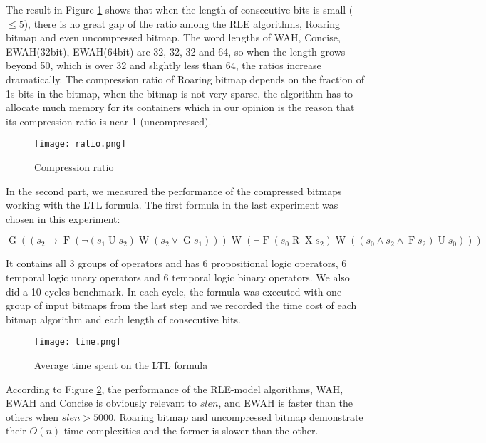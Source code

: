 The result in Figure \ref{img:ratio} shows that when the length of consecutive bits is small ($\leq 5$), there is no great gap of the ratio among the RLE algorithms, Roaring bitmap and even uncompressed bitmap. The word lengths of WAH, Concise, EWAH(32bit), EWAH(64bit) are 32, 32, 32 and 64, so when the length grows beyond 50, which is over 32 and slightly less than 64, the ratios increase dramatically. The compression ratio of Roaring bitmap depends on the fraction of 1s bits in the bitmap, when the bitmap is not very sparse, the algorithm has to allocate much memory for its containers which in our opinion is the reason that its compression ratio is near 1 (uncompressed).

\begin{figure}[h]
\begin{center}
\centering
\texttt{[image: ratio.png]}
\caption{Compression ratio}
\label{img:ratio}
\end{center}
\end{figure}

In the second part, we measured the performance of the compressed bitmaps working with the LTL formula. The first formula in the last experiment was chosen in this experiment: 

\begin{small}
$\mathop{G}((s_2 \mathrel{\rightarrow} \mathop{F}(\mathop{\neg}(s_1 \mathrel{U} s_2) \mathrel{W} (s_2 \mathrel{\vee} \mathop{G}s_1))) \mathrel{W} (\mathop{\neg}\mathop{F}(s_0 \mathrel{R} \mathop{X}s_2) \mathrel{W} ((s_0 \mathrel{\wedge} s_2 \mathrel{\wedge} \mathop{F}s_2) \mathrel{U} s_0)))$
\end{small}

It contains all 3 groups of operators and has 6 propositional logic operators, 6 temporal logic unary operators and 6 temporal logic binary operators. We also did a 10-cycles benchmark. In each cycle, the formula was executed with one group of input bitmaps from the last step and we recorded the time cost of each bitmap algorithm and each length of consecutive bits.

\begin{figure}[h]
\begin{center}
\centering
\texttt{[image: time.png]}
\caption{Average time spent on the LTL formula}
\label{img:time}
\end{center}
\end{figure}

According to Figure \ref{img:time}, the performance of the RLE-model algorithms, WAH, EWAH and Concise is obviously relevant to $slen$, and EWAH is faster than the others when $slen > 5000$. Roaring bitmap and uncompressed bitmap demonstrate their $O(n)$ time complexities and the former is slower than the other.

